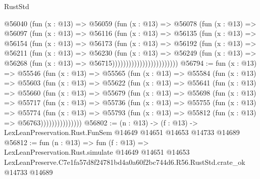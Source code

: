 \begin{lexlean}{RustStd}
\begin{coremodule}
                        @56040
                          (fun (x : @13) =>
                          @56059
                            (fun (x : @13) =>
                            @56078
                              (fun (x : @13) =>
                              @56097
                                (fun (x : @13) =>
                                @56116
                                  (fun (x : @13) =>
                                  @56135
                                    (fun (x : @13) =>
                                    @56154
                                      (fun (x : @13) =>
                                      @56173
                                        (fun (x : @13) =>
                                        @56192
                                          (fun (x : @13) =>
                                          @56211
                                            (fun (x : @13) =>
                                            @56230
                                              (fun (x : @13) =>
                                              @56249
                                                (fun (x : @13) =>
                                                @56268
                                                  (fun (x : @13) => @56715))))))))))))))))))))))))
@56794 := fun (x : @13) =>
  @55546
    (fun (x : @13) =>
    @55565
      (fun (x : @13) =>
      @55584
        (fun (x : @13) =>
        @55603
          (fun (x : @13) =>
          @55622
            (fun (x : @13) =>
            @55641
              (fun (x : @13) =>
              @55660
                (fun (x : @13) =>
                @55679
                  (fun (x : @13) =>
                  @55698
                    (fun (x : @13) =>
                    @55717
                      (fun (x : @13) =>
                      @55736
                        (fun (x : @13) =>
                        @55755
                          (fun (x : @13) =>
                          @55774
                            (fun (x : @13) =>
                            @55793 (fun (x : @13) => @55812 (fun (x : @13) => @56763)))))))))))))))
@56802 := (n : @13) ->
  (f : @13) -> LexLeanPreservation.Rust.FunSem @14649 @14651 @14653 @14733 @14689
@56812 := fun (n : @13) =>
  fun (f : @13) =>
  LexLeanPreservation.Rust.simulate
    @14649
    @14651
    @14653
    LexLeanPreserve.C7e1fa57d8f24781bd4a0a60f2bc744d6.R56.RustStd.crate_ok
    @14733
    @14689
\end{coremodule}
\end{lexlean}
